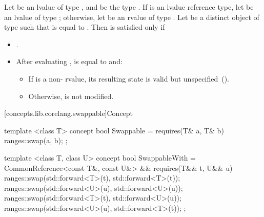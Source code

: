 \begin{itemdescr}
\pnum
Let  be an lvalue of type , and  be the
type . If  is an lvalue reference
type, let  be an lvalue of type ;
otherwise, let  be an rvalue of type .
Let  be a distinct object of type  such that
 is equal to .
Then  is satisfied only if

\begin{itemize}
\item {}.
\item After evaluating ,  is equal to  and:
\begin{itemize}
\item If  is a non- rvalue, its resulting
state is valid but unspecified~().
\item Otherwise,  is not modified.
\end{itemize}
\end{itemize}
\end{itemdescr}

[concepts.lib.corelang.swappable]{Concept }

%
\begin{itemdecl}
template <class T>
concept bool Swappable =
  requires(T& a, T& b) {
    ranges::swap(a, b);
  };

template <class T, class U>
concept bool SwappableWith =
  CommonReference<const T&, const U&> &&
  requires(T&& t, U&& u) {
    ranges::swap(std::forward<T>(t), std::forward<T>(t));
    ranges::swap(std::forward<U>(u), std::forward<U>(u));
    ranges::swap(std::forward<T>(t), std::forward<U>(u));
    ranges::swap(std::forward<U>(u), std::forward<T>(t));
  };
\end{itemdecl}

